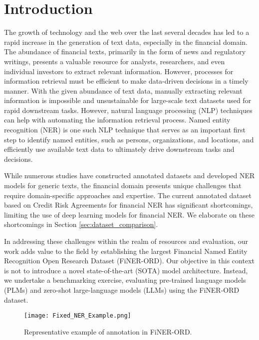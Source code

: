 \documentclass[11pt]{article}
\begin{document}
\section{Introduction}
The growth of technology and the web over the last several decades has led to a rapid increase in the generation of text data, especially in the financial domain. The abundance of financial texts, primarily in the form of news and regulatory writings, presents a valuable resource for analysts, researchers, and even individual investors to extract relevant information. However, processes for information retrieval must be efficient to make data-driven decisions in a timely manner. With the given abundance of text data, manually extracting relevant information is impossible and unsustainable for large-scale text datasets used for rapid downstream tasks. However, natural language processing (NLP) techniques can help with automating the information retrieval process. Named entity recognition (NER) is one such NLP technique that serves as an important first step to identify named entities, such as persons, organizations, and locations, and efficiently use available text data to ultimately drive downstream tasks and decisions.

While numerous studies have constructed annotated datasets \citep{sang2003introduction, derczynski2017results, AB2-MKJJ2R-2013} and developed NER models \citep{li2019dice, yamada2020luke, wang2020automated, wang2021improving} for generic texts, the financial domain presents unique challenges that require domain-specific approaches and expertise. The current annotated dataset based on Credit Risk Agreements \cite{alvarado2015domain} for financial NER has significant shortcomings, limiting the use of deep learning models for financial NER. We elaborate on these shortcomings in Section \ref{sec:dataset_comparison}.

In addressing these challenges within the realm of resources and evaluation, our work adds value to the field by establishing the largest Financial Named Entity Recognition Open Research Dataset (FiNER-ORD). Our objective in this context is not to introduce a novel state-of-the-art (SOTA) model architecture. Instead, we undertake a benchmarking exercise, evaluating pre-trained language models (PLMs) and zero-shot large-language models (LLMs) using the FiNER-ORD dataset.



\begin{figure}[ht]
    \centering
        \texttt{[image: Fixed\_NER\_Example.png]}
    \caption{Representative example of annotation in FiNER-ORD.}
    \label{fig:nerexample}
\end{figure}
\end{document}
